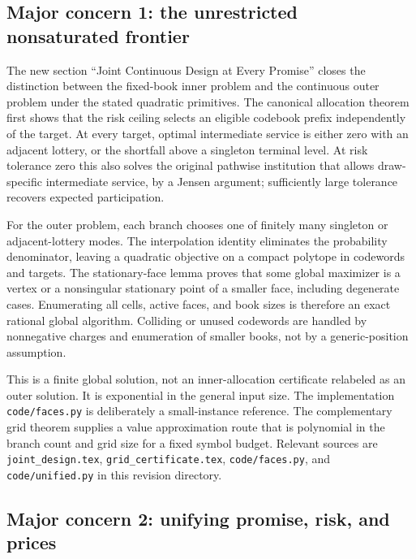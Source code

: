 \documentclass[11pt,letterpaper]{article}
\begin{document}
\subsection*{Major concern 1: the unrestricted nonsaturated frontier}


The new section “Joint Continuous Design at Every Promise” closes the distinction between the fixed-book inner problem and the continuous outer problem under the stated quadratic primitives. The canonical allocation theorem first shows that the risk ceiling selects an eligible codebook prefix independently of the target. At every target, optimal intermediate service is either zero with an adjacent lottery, or the shortfall above a singleton terminal level. At risk tolerance zero this also solves the original pathwise institution that allows draw-specific intermediate service, by a Jensen argument; sufficiently large tolerance recovers expected participation.



For the outer problem, each branch chooses one of finitely many singleton or adjacent-lottery modes. The interpolation identity eliminates the probability denominator, leaving a quadratic objective on a compact polytope in codewords and targets. The stationary-face lemma proves that some global maximizer is a vertex or a nonsingular stationary point of a smaller face, including degenerate cases. Enumerating all cells, active faces, and book sizes is therefore an exact rational global algorithm. Colliding or unused codewords are handled by nonnegative charges and enumeration of smaller books, not by a generic-position assumption.



This is a finite global solution, not an inner-allocation certificate relabeled as an outer solution. It is exponential in the general input size. The implementation \nolinkurl{code/faces.py} is deliberately a small-instance reference. The complementary grid theorem supplies a value approximation route that is polynomial in the branch count and grid size for a fixed symbol budget. Relevant sources are \nolinkurl{joint_design.tex}, \nolinkurl{grid_certificate.tex}, \nolinkurl{code/faces.py}, and \nolinkurl{code/unified.py} in this revision directory.



\subsection*{Major concern 2: unifying promise, risk, and prices}
\end{document}
